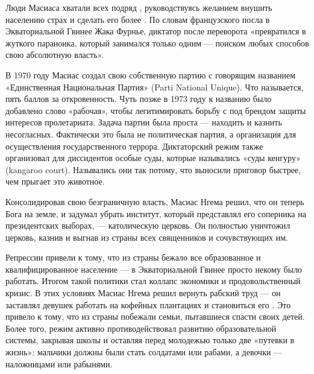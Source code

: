 \begin{fancyquotes}
    Люди Масиаса хватали всех подряд , руководствуясь желанием внушить населению страх и сделать его более . По словам французского посла в Экваториальной Гвинее Жака Фурнье, диктатор после переворота «превратился в жуткого параноика, который занимался только одним --- поиском любых способов  свою абсолютную власть».
\end{fancyquotes}

В 1970 году Масиас создал свою собственную партию с говорящим названием «Единственная Национальная Партия» (Parti National Unique). Что называется, пять баллов за откровенность. Чуть позже в 1973 году к названию было добавлено слово «рабочая», чтобы легитимировать борьбу с  под брендом защиты интересов пролетариата. Задача партии была проста --- находить и казнить несогласных. Фактически это была не политическая партия, а организация для осуществления государственного террора. Диктаторский режим также организовал для диссидентов особые суды, которые назывались «суды кенгуру» (kangaroo court). Назывались они так потому, что выносили приговор быстрее, чем прыгает это животное.

\begin{fancyquotes}
    Консолидировав свою безграничную власть, Масиас Нгема решил, что он теперь  Бога на земле, и задумал убрать институт, который представлял его соперника на президентских выборах, --- католическую церковь. Он полностью уничтожил церковь, казнив и выгнав из страны всех священников и сочувствующих им.
\end{fancyquotes}

Репрессии привели к тому, что из страны бежало все образованное и квалифицированное население --- в Экваториальной Гвинее просто некому было работать. Итогом такой  политики стал коллапс экономики и продовольственный кризис. В этих условиях Масиас Нгема решил вернуть рабский труд --- он заставлял девушек работать на кофейных плантациях и становиться  его . Это привело к тому, что из страны побежали семьи, пытавшиеся спасти своих детей. Более того, режим активно противодействовал развитию образовательной системы, закрывая школы и оставляя перед молодежью только две «путевки в жизнь»: мальчики должны были стать солдатами или рабами, а девочки --- наложницами или рабынями.

